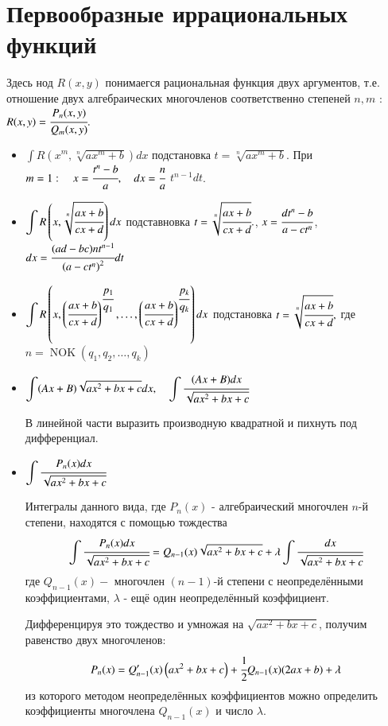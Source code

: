 \documentclass[twoside, a4paperpt]{extarticle}
\begin{document}
\section*{Первообразные иррациональных функций}
Здесь нод $R(x, y)$ понимаегся рациональная функция двух аргументов, т.е. отношение двух алгебраических многочленов соответственно степеней $n, m$ :
$R(x, y)=\cfrac{P_{n}(x, y)}{Q_{m}(x, y)} .$

\begin{itemize}
    \item $\displaystyle \int R(x^m, \sqrt[n]{a x^m +b}) d x$ подстановка $t = \sqrt[n]{a x^m +b}$. При $m = 1: \quad x=\cfrac{t^{n}-b}{a}, \quad d x=\cfrac{n}{a}$ $t^{n-1} d t $.
    \item $\displaystyle \int R\left(x, \sqrt[n]{\cfrac{a x+b}{c x+d}}\right) d x$ подставновка $t=\sqrt[n]{\cfrac{a x+b}{c x+d}} .$, $x=\cfrac{d t^{n}-b}{a-c t^{n}}$, $d x=\cfrac{(a d-b c) n t^{n-1}}{\left(a-c t^{n}\right)^{2}} d t$
    \item $\displaystyle \int R\left(x,\left(\cfrac{a x+b}{c x+d}\right)^{\cfrac{p_{1}}{q_{1}}}, \ldots,\left(\cfrac{a x+b}{c x+d}\right)^{\cfrac{p_{k}}{q_{k}}}\right) d x$  подстановка $t=\sqrt[n]{\cfrac{a x+b}{c x+d}}, $ где $ n=\operatorname{NOK}\left(q_{1}, q_{2}, \ldots, q_{k}\right)$
    
    \item $\displaystyle \int(A x+B) \sqrt{a x^{2}+b x+c} d x, \quad \displaystyle \int \cfrac{(A x+B) d x}{\sqrt{a x^{2}+b x+c}}$ 
    
    В линейной части выразить производную квадратной и пихнуть под дифференциал.

    \item $\displaystyle \int \cfrac{P_{n}(x) d x}{\sqrt{a x^{2}+b x+c}}$
    
    Интегралы данного вида, где $P_{n}(x)$ - алгебраический многочлен $n$-й степени, находятся с помощью тождества
    $$
    \displaystyle \int \cfrac{P_{n}(x) d x}{\sqrt{a x^{2}+b x+c}}=Q_{n-1}(x) \sqrt{a x^{2}+b x+c}+\lambda \displaystyle \int \cfrac{d x}{\sqrt{a x^{2}+b x+c}}
    $$
    где $Q_{n-1}(x)-$ многочлен $(n-1)$-й степени с неопределёнными коэффициентами, $\lambda$ - ещё один неопределённый коэффициент. 
    
    Дифференцируя это тождество и умножая на $\sqrt{a x^{2}+b x+c}$, получим равенство двух многочленов:
    $$
    P_{n}(x)=Q_{n-1}^{\prime}(x)\left(a x^{2}+b x+c\right)+\cfrac{1}{2} Q_{n-1}(x)(2 a x+b)+\lambda
    $$
    из которого методом неопределённых коэффициентов можно определить коэффициенты многочлена $Q_{n-1}(x)$ и число $\lambda$.


\end{itemize}
\end{document}
